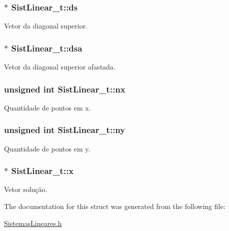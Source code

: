 \subsubsection[{\texorpdfstring{ds}{ds}}]{$\ast$ Sist\+Linear\+\_\+t\+::ds}\hypertarget{structSistLinear__t_add986d7f6004231eee2d838e7bc7596b}{}\label{structSistLinear__t_add986d7f6004231eee2d838e7bc7596b}
Vetor da diagonal superior. 
\subsubsection[{\texorpdfstring{dsa}{dsa}}]{$\ast$ Sist\+Linear\+\_\+t\+::dsa}\hypertarget{structSistLinear__t_a02d4791c1278b1a6a2796617e43fe29b}{}\label{structSistLinear__t_a02d4791c1278b1a6a2796617e43fe29b}
Vetor da diagonal superior afastada. 
\subsubsection[{\texorpdfstring{nx}{nx}}]{\setlength{\rightskip}{0pt plus 5cm}unsigned int Sist\+Linear\+\_\+t\+::nx}\hypertarget{structSistLinear__t_a0f02ce66276316fd835180cf6a033001}{}\label{structSistLinear__t_a0f02ce66276316fd835180cf6a033001}
Quantidade de pontos em x. 
\subsubsection[{\texorpdfstring{ny}{ny}}]{\setlength{\rightskip}{0pt plus 5cm}unsigned int Sist\+Linear\+\_\+t\+::ny}\hypertarget{structSistLinear__t_a84d8f1f84f050ca4dfc93a4ceaef2b9a}{}\label{structSistLinear__t_a84d8f1f84f050ca4dfc93a4ceaef2b9a}
Quantidade de pontos em y. 
\subsubsection[{\texorpdfstring{x}{x}}]{$\ast$ Sist\+Linear\+\_\+t\+::x}\hypertarget{structSistLinear__t_a106437fbdef1dee46d7b1c34509e0da1}{}\label{structSistLinear__t_a106437fbdef1dee46d7b1c34509e0da1}
Vetor solução. 

The documentation for this struct was generated from the following file\+:\begin{DoxyCompactItemize}
\item 
\hyperlink{SistemasLineares_8h}{Sistemas\+Lineares.\+h}\end{DoxyCompactItemize}
